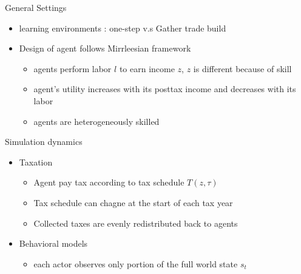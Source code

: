 \documentclass{beamer}
\begin{document}
    \begin{frame}
        \titlepage
        \begin{figure}[htpb]
            \centering
        \end{figure}
    \end{frame}

    \begin{frame}
        \tableofcontents[sectionstyle=show,subsectionstyle=show/shaded/hide,subsubsectionstyle=show/shaded/hide]
    \end{frame}

    \begin{frame}{General Settings}
        \begin{itemize}
            \item learning environments : one-step v.s Gather trade build 
            \item Design of agent follows Mirrleesian framework
                \begin{itemize}
                    \item agents perform labor $l$ to earn income $z$, $z$ is different because of skill
                    \item agent's utility increases with its posttax income and decreases with its labor
                    \item agents are heterogeneously skilled
                \end{itemize}
        \end{itemize}
        
    \end{frame}
    
    \begin{frame}{Simulation dynamics}
        \begin{itemize}
            \item Taxation
                \begin{itemize}
                    \item Agent pay tax according to tax schedule $T(z, \tau)$
                    \item Tax schedule can chagne at the start of each tax year
                    \item Collected taxes are evenly redistributed back to agents
                \end{itemize}
            \item Behavioral models
                \begin{itemize}
                    \item each actor observes only portion of the full world state $s_t$
                \end{itemize}
        \end{itemize}

    \end{frame}
\end{document}
